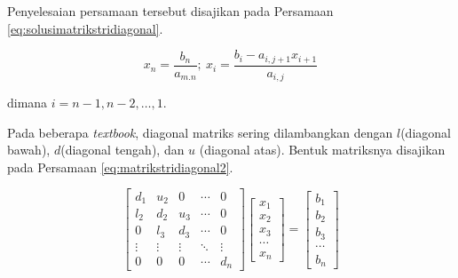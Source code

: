 \documentclass[]{book}
\theoremstyle{definition}
\theoremstyle{definition}
\theoremstyle{definition}
\theoremstyle{remark}
\begin{document}
Penyelesaian persamaan tersebut disajikan pada Persamaan \eqref{eq:solusimatrikstridiagonal}.

\begin{equation}
x_n=\frac{b_n}{a_{m.n}};\ x_i=\frac{b_i-a_{i,j+1}x_{i+1}}{a_{i,j}}
  \label{eq:solusimatrikstridiagonal}
\end{equation}

dimana \(i=n-1,n-2,\dots,1\).

Pada beberapa \emph{textbook}, diagonal matriks sering dilambangkan dengan \(l\)(diagonal bawah), \(d\)(diagonal tengah), dan \(u\) (diagonal atas). Bentuk matriksnya disajikan pada Persamaan \eqref{eq:matrikstridiagonal2}.

\begin{equation}
\begin{bmatrix}
     d_{1} & u_{2} & 0       &\cdots& 0                 \\[0.3em]
     l_{2} & d_{2} & u_{3} &\cdots& 0             \\[0.3em]
     0       & l_{3} & d_{3} &\cdots& 0             \\[0.3em]
     \vdots  & \vdots  & \vdots  &\ddots& \vdots            \\[0.3em]
     0       & 0       & 0       &\cdots& d_{n}
     \end{bmatrix}
\begin{bmatrix}
     x_1                                          \\[0.3em]
     x_2                                          \\[0.3em]
     x_3                                          \\[0.3em]
     \cdots                                       \\[0.3em]
     x_n                                       
     \end{bmatrix}
= \begin{bmatrix}
     b_1                                          \\[0.3em]
     b_2                                          \\[0.3em]
     b_3                                          \\[0.3em]
     \cdots                                       \\[0.3em]
     b_n                                       
     \end{bmatrix}
  \label{eq:matrikstridiagonal2}
\end{equation}
\end{document}
